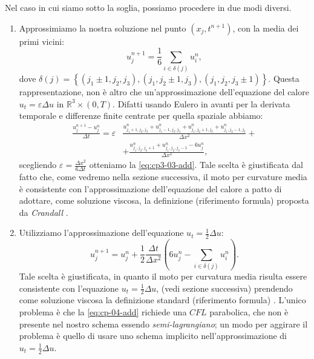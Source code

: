 Nel caso in cui siamo sotto la soglia, possiamo procedere in due modi diversi.
\begin{enumerate}
  \item Approssimiamo la nostra soluzione nel punto $(x_j,t^{n+1})$, con la media dei primi vicini:
    \begin{equation}
      \label{eq:cp3-03-add}
      u_j^{n+1}=\frac{1}{6}\sum_{i\in\delta(j)}u_i^n,
    \end{equation}
dove $\delta(j)=\left\{(j_1\pm 1,j_2,j_3),(j_1,j_2\pm 1,j_3),(j_1,j_2,j_3\pm 1)\right\}$. Questa rappresentazione, non è altro che un'approssimazione dell'equazione del calore $u_t=\varepsilon\Delta u$ in $\mathbb{R}^3\times(0,T)$. Difatti usando Eulero in avanti per la derivata temporale e differenze finite centrate per quella spaziale abbiamo:
\[
\begin{aligned}
  \frac{u_j^{n+1}-u_j^n}{\Delta t}=\varepsilon&\frac{u_{j_1 + 1,j_2,j_3}^n +
    u_{j_1 - 1,j_2,j_3}^n + u_{j_1,j_2 + 1,j_3}^n + u_{j_1,j_2 - 1,j_3}^n}{\Delta x^2} + \\
    &+ \frac{u_{j_1,j_2,j_3 + 1}^n + u_{j_1,j_2,j_3 - 1}^n - 6u_j^n}{\Delta x^2},
\end{aligned}
\]
scegliendo $\varepsilon=\frac{\Delta x^2}{6\Delta t}$ otteniamo la \eqref{eq:cp3-03-add}.
Tale scelta è giustificata dal fatto che, come vedremo nella sezione successiva, il moto per curvature media è consistente con l'approssimazione dell'equazione del calore a patto di adottare, come soluzione viscosa, la definizione (riferimento formula) proposta da \emph{Crandall} \cite[vedi][]{crand:lion}.

  \item Utilizziamo l'approssimazione dell'equazione $u_t=\frac{1}{2}\Delta u$:
    \begin{equation}
      \label{eq:cp-04-add}
      u_j^{n+1}=u_j^n +\frac{1}{2}\frac{\Delta t}{\Delta x^2}\left(6u_j^n - \sum_{i\in\delta(j)}u_i^n\right).
    \end{equation}
Tale scelta è giustificata, in quanto il moto per curvatura media risulta essere consistente con l'equazione $u_t=\frac{1}{2}\Delta u$, (vedi sezione successiva) prendendo come soluzione viscosa la definizione standard (riferimento formula) \cite[vedi][]{fed:drag}. L'unico problema è che la \eqref{eq:cp-04-add}
richiede una $\mathit{CFL}$ parabolica, che non è presente nel nostro schema essendo \emph{semi-lagrangiano}; un modo per aggirare il problema è quello di usare uno schema implicito nell'approssimazione di  $u_t=\frac{1}{2}\Delta u$.
\end{enumerate}
